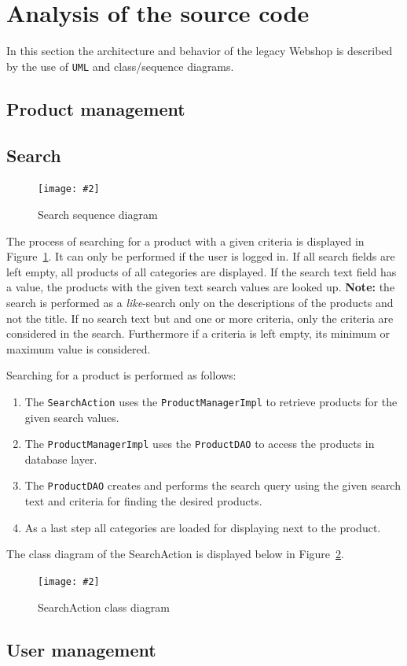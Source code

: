 \documentclass[11pt]{article}
\newcommand{\cgraphic}[3]
{
	\begin{figure}[htb]
		\begin{center}
		\texttt{[image: \#2]}
		\end{center}
		\caption{#3}
		\label{fig:#2}
	\end{figure}
}%
\begin{document}
	\section{Analysis of the source code}
    In this section the architecture and behavior of the legacy Webshop is described by the use of \texttt{UML} and class/sequence diagrams.
    
    \subsection{Product management} %
    
    \subsection{Search} %
    \cgraphic{.5}{searchAction-seq}{Search sequence diagram}
    The process of searching for a product with a given criteria is displayed in Figure~\ref{fig:searchAction-seq}. It can only be performed if the user is logged in. If all search fields are left empty, all products of all categories are displayed. If the search text field has a value, the products with the given text search values are looked up. \textbf{Note:} the search is performed as a \textit{like}-search only on the descriptions of the products and not the title. If no search text but and one or more criteria, only the criteria are considered in the search. Furthermore if a criteria is left empty, its minimum or maximum value is considered.
    
   Searching for a product is performed as follows: 
   \begin{enumerate}
   	\item The \texttt{SearchAction} uses the \texttt{ProductManagerImpl} to retrieve products for the given search values.
   	\item The \texttt{ProductManagerImpl} uses the \texttt{ProductDAO} to access the products in database layer.
   	\item The \texttt{ProductDAO} creates and performs the search query using the given search text and criteria for finding the desired products.
   	\item As a last step all categories are loaded for displaying next to the product.
   \end{enumerate}
   
   The class diagram of the SearchAction is displayed below in Figure~\ref{fig:searchAction-class}.
   \cgraphic{.5}{searchAction-class}{SearchAction class diagram}  
   
   \subsection{User management} %
      
      
\end{document}
